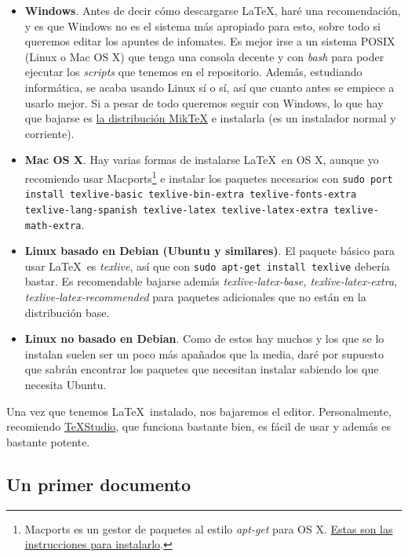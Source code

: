 \begin{itemize}
\item \textbf{Windows}. Antes de decir cómo descargarse \LaTeX, haré una recomendación, y es que Windows no es el sistema más apropiado para esto, sobre todo si queremos editar los apuntes de infomates. Es mejor irse a un sistema POSIX (Linux o Mac OS X) que tenga una consola decente y con \textit{bash} para poder ejecutar los \textit{scripts} que tenemos en el repositorio. Además, estudiando informática, se acaba usando Linux sí o sí, así que cuanto antes se empiece a usarlo mejor. Si a pesar de todo queremos seguir con Windows, lo que hay que bajarse es \href{http://miktex.org/download}{la distribución MikTeX} e instalarla (es un instalador normal y corriente).

\item \textbf{Mac OS X}. Hay varias formas de instalarse \LaTeX\ en OS X, aunque yo recomiendo usar Macports\footnote{Macports es un gestor de paquetes al estilo \textit{apt-get} para OS X. \href{https://www.macports.org/install.php}{Estas son las instrucciones para instalarlo}.} e instalar los paquetes necesarios con \texttt{sudo port install texlive-basic texlive-bin-extra texlive-fonts-extra texlive-lang-spanish texlive-latex texlive-latex-extra texlive-math-extra}.

\item \textbf{Linux basado en Debian (Ubuntu y similares)}. El paquete básico para usar \LaTeX\ es \textit{texlive}, así que con \texttt{sudo apt-get install texlive} debería bastar. Es recomendable bajarse además \textit{texlive-latex-base, texlive-latex-extra, texlive-latex-recommended} para paquetes adicionales que no están en la distribución base.

\item \textbf{Linux no basado en Debian}. Como de estos hay muchos y los que se lo instalan suelen ser un poco más apañados que la media, daré por supuesto que sabrán encontrar los paquetes que necesitan instalar sabiendo los que necesita Ubuntu.
\end{itemize}

Una vez que tenemos \LaTeX\ instalado, nos bajaremos el editor. Personalmente, recomiendo \href{http://www.texstudio.org/}{TeXStudio}, que funciona bastante bien, es fácil de usar y además es bastante potente.

\subsection{Un primer documento}
\label{sec:EstructuraDocumento}

